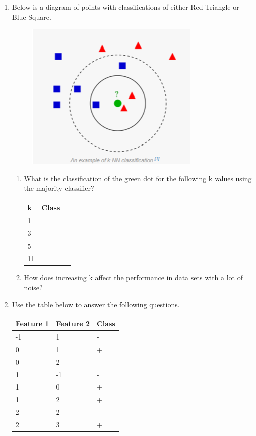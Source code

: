 \documentclass{report}
\begin{document}
\begin{enumerate}
  \item Below is a diagram of points with classifications of either Red Triangle or Blue Square. 
	\begin{figure}[H]
	  \centering
	  \includegraphics{image/Picture2.png}
	\end{figure}  
  	
  	\begin{enumerate}
  	  \item What is the classification of the green dot for the following k values using the majority classifier?
  	    \begin{center}
          \begin{tabular}{| l | l | l |}
            \hline
            k & Class \\ \hline
            1 & \\
            3 & \\
            5 & \\
			11 & \\            
            \hline
          \end{tabular}
        \end{center} 
        
        \item How does increasing k affect the performance in data sets with a lot of noise?
  	  \end{enumerate} 
  
  \item Use the table below to answer the following questions.
    \begin{center}
      \begin{tabular}{| l | l | l |}
        \hline
        Feature 1 & Feature 2 & Class \\ \hline
        -1 & 1 & - \\
        0 & 1 & + \\
        0 & 2 & - \\
        1 & -1 & - \\
        1 & 0 & + \\
        1 & 2 & + \\
        2 & 2 & - \\
        2 & 3 & + \\
        \hline
      \end{tabular}
    \end{center} 
  	

\end{enumerate}
\end{document}
